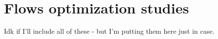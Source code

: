 \chapter{Flows optimization studies}

Idk if I'll include all of these - but I'm putting them here just in case.





%

%